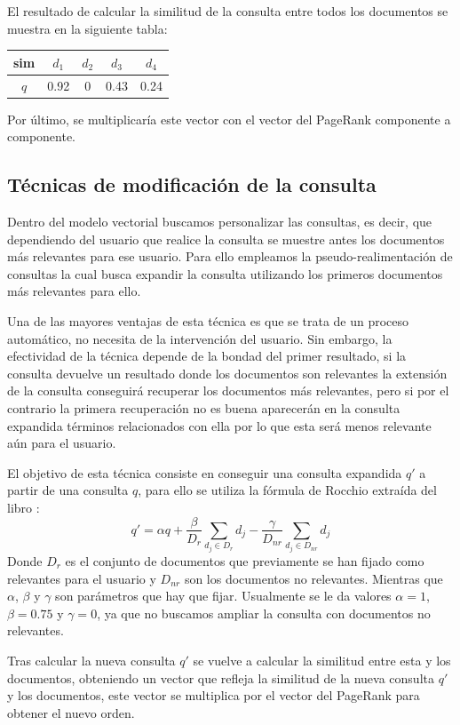 \documentclass[size=a4, parskip=half, titlepage=false, toc=flat, toc=bib, 12pt]{scrartcl}
\theoremstyle{theorem-style}
\theoremstyle{definition-style}
\theoremstyle{remark-style}
\theoremstyle{example-style}
\theoremstyle{definition-style}
\theoremstyle{remark-style}
\begin{document}
El resultado de calcular la similitud de la consulta entre todos los documentos se muestra en la siguiente tabla:
\begin{table}[H]
\centering
\begin{tabular}{|c|c|c|c|c|}
\hline
sim & $d_1$ & $d_2$ & $d_3$ & $d_4$ \\ \hline
$q$ & 0.92  & 0     & 0.43  & 0.24  \\ \hline
\end{tabular}
\end{table}
Por último, se multiplicaría este vector con el vector del PageRank componente a componente.

\subsection{Técnicas de modificación de la consulta}
Dentro del modelo vectorial buscamos personalizar las consultas, es decir, que dependiendo del usuario que realice la consulta se muestre antes los documentos más relevantes para ese usuario. Para ello empleamos la pseudo-realimentación de consultas la cual busca expandir la consulta utilizando los primeros documentos más relevantes para ello.

Una de las mayores ventajas de esta técnica es que se trata de un proceso automático, no necesita de la intervención del usuario. Sin embargo, la efectividad de la técnica depende de la bondad del primer resultado, si la consulta devuelve un resultado donde los documentos son relevantes la extensión de la consulta conseguirá recuperar los documentos más relevantes, pero si por el contrario la primera recuperación no es buena aparecerán en la consulta expandida términos relacionados con ella por lo que esta será menos relevante aún para el usuario.

El objetivo de esta técnica consiste en conseguir una consulta expandida $q'$ a partir de una consulta $q$, para ello se utiliza la fórmula de Rocchio extraída del libro \cite{ri}:
$$q' = \alpha q + \frac{\beta}{D_r} \sum_{d_j \in D_r} d_j - \frac{\gamma}{D_{nr}} \sum_{d_j \in D_{nr}} d_j $$
Donde $D_{r}$ es el conjunto de documentos que previamente se han fijado como relevantes para el usuario y $D_{nr}$ son los documentos no relevantes. Mientras que $\alpha$, $\beta$ y $\gamma$ son parámetros que hay que fijar. Usualmente se le da valores $\alpha = 1$, $\beta = 0.75$ y $\gamma = 0$, ya que no buscamos ampliar la consulta con documentos no relevantes.

Tras calcular la nueva consulta $q'$ se vuelve a calcular la similitud entre esta y los documentos, obteniendo un vector que refleja la similitud de la nueva consulta $q'$ y los documentos, este vector se multiplica por el vector del PageRank para obtener el nuevo orden.
\end{document}
